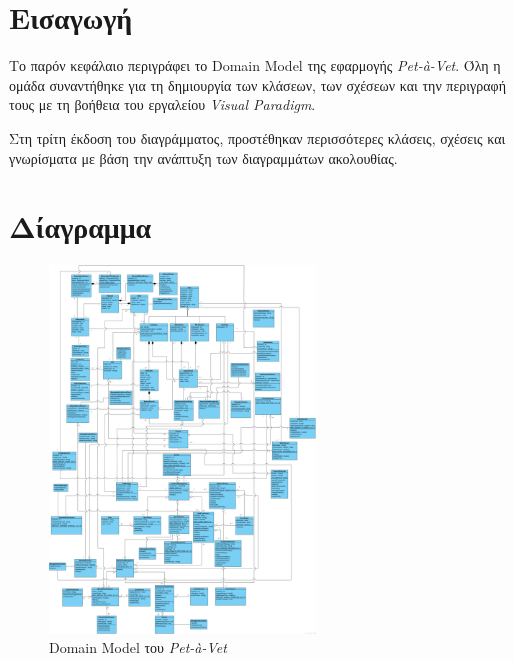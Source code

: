 \documentclass[12pt,a4paper,twoside]{book}
\begin{document}
\section{Εισαγωγή}
Το παρόν κεφάλαιο περιγράφει το Domain Model της εφαρμογής \textit{Pet-à-Vet}. Όλη η ομάδα συναντήθηκε για τη δημιουργία των κλάσεων, των σχέσεων και την περιγραφή τους με τη βοήθεια του εργαλείου \textit{Visual Paradigm}. %

Στη τρίτη έκδοση του διαγράμματος, προστέθηκαν περισσότερες κλάσεις, σχέσεις και γνωρίσματα με βάση την ανάπτυξη των διαγραμμάτων ακολουθίας. %

\section{Δίαγραμμα}
\begin{figure}[H]
    \centering
    \includegraphics[width=0.63\textwidth]{Resources/Domain-model-v0.3.png}
    \caption{Domain Model του \textit{Pet-à-Vet}}\label{fig:domain_model}
\end{figure}
\end{document}
